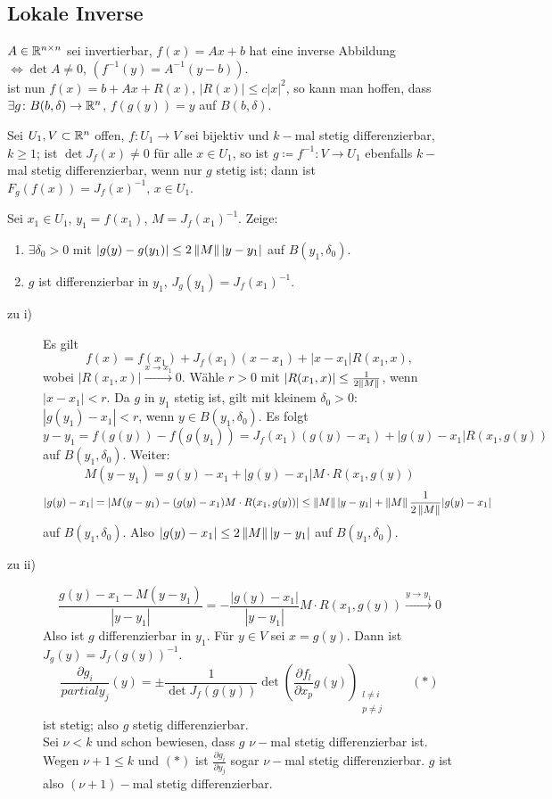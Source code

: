 \subsection{Lokale Inverse}
\begin{bemerkung*}[Vorbetrachtung]
	$ A\in\mathbb{R}^{n\times n} $ sei invertierbar, $ f(x)=Ax+b $ hat eine inverse Abbildung$ \Leftrightarrow\det A\neq 0 $, $ (f^{-1}(y)=A^{-1}(y-b)) $.\\
	ist nun $ f(x)=b+Ax+R(x) $, $ |R(x)|\leq c|x|^2 $, so kann man hoffen, dass $ \exists g\colon B(b,\delta)\rightarrow\mathbb{R}^n $, $ f(g(y))=y $ auf $ B(b,\delta) $.
\end{bemerkung*}
\begin{satz}
	Sei $ U_1,V\subset\mathbb{R}^n $ offen, $ f\colon U_1\rightarrow V $ sei bijektiv und $ k- $mal stetig differenzierbar, $ k\geq 1 $; ist $ \det J_f(x)\neq 0 $ f\"ur alle $ x\in U_1 $, so ist $ g\coloneqq f^{-1}\colon V\rightarrow U_1 $ ebenfalls $ k- $mal stetig differenzierbar, wenn nur $ g $ stetig ist; dann ist $ F_g(f(x))=J_f(x)^{-1} $, $ x\in U_1 $.
\end{satz}
\begin{beweis}
	Sei $ x_1\in U_1 $, $ y_1=f(x_1) $, $ M=J_f(x_1)^{-1} $. Zeige:
	\begin{enumerate}
		\item $ \exists\delta_0>0 $ mit $ |g(y)-g(y_1)|\leq 2\left\|M\right\||y-y_1| $ auf $ B(y_1,\delta_0) $.
		\item $ g $ ist differenzierbar in $ y_1 $, $ J_g(y_1)=J_f(x_1)^{-1} $.
	\end{enumerate}
	\begin{description}
		\item[zu i)] Es gilt \[ f(x)=f(x_1)+J_f(x_1)(x-x_1)+|x-x_1|R(x_1,x), \]
		wobei $ |R(x_1,x)|\xrightarrow{x\to x_1}0 $. W\"ahle $ r>0 $ mit $ |R(x_1,x)|\leq\frac{1}{2\left\|M\right\|} $, wenn $ |x-x_1|<r $. Da $ g $ in $ y_1 $ stetig ist, gilt mit kleinem $ \delta_0>0 $: $ |g(y_1)-x_1|<r $, wenn $ y\in B(y_1,\delta_0) $. Es folgt
		\[ y-y_1=f(g(y))-f(g(y_1))=J_f(x_1)(g(y)-x_1)+|g(y)-x_1|R(x_1,g(y)) \]
		auf $ B(y_1,\delta_0) $. Weiter:
		\[ M(y-y_1)=g(y)-x_1+|g(y)-x_1|M\cdot R(x_1,g(y)) \]
		\[ |g(y)-x_1|=|M(y-y_1)-(g(y)-x_1)M\cdot R(x_1,g(y))|\leq \left\|M\right\||y-y_1|+\left\|M\right\|\frac{1}{2\left\|M\right\|}|g(y)-x_1| \]
		auf $ B(y_1,\delta_0) $. Also $ |g(y)-x_1|\leq 2\left\|M\right\||y-y_1| $ auf $ B(y_1,\delta_0) $.
		\item[zu ii)]
		\[ \frac{g(y)-x_1-M(y-y_1)}{|y-y_1|}=-\frac{|g(y)-x_1|}{|y-y_1|}M\cdot R(x_1,g(y))\xrightarrow{y\to y_1}0 \]
		Also ist $ g $ differenzierbar in $ y_1 $. F\"ur $ y\in V $ sei $ x=g(y) $. Dann ist $ J_g(y)=J_f(g(y))^{-1} $.
		\[ \frac{\partial g_i}{partial y_j}(y)=\pm\frac{1}{\det J_f(g(y))}\det\left(\frac{\partial f_l}{\partial x_p}g(y)\right)_{\substack{l\neq i\\p\neq j}}\qquad(\ast) \]
		ist stetig; also $ g $ stetig differenzierbar.\\
		Sei $ \nu<k $ und schon bewiesen, dass $ g $ $ \nu- $mal stetig differenzierbar ist. Wegen $ \nu+1\leq k $ und $ (\ast) $ ist $ \frac{\partial g_i}{\partial y_j} $ sogar $ \nu- $mal stetig differenzierbar. $ g $ ist also $ (\nu+1)- $mal stetig differenzierbar.
	\end{description}
\end{beweis}
